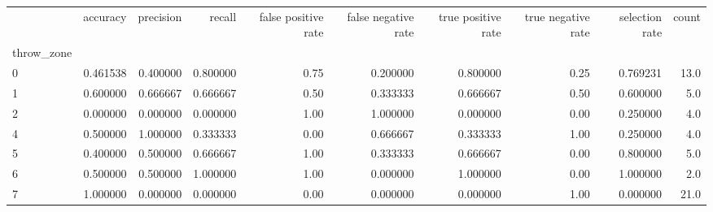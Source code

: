 \begin{tabular}{lrrrrrrrrr}
\toprule
{} &  accuracy &  precision &    recall &  false positive rate &  false negative rate &  true positive rate &  true negative rate &  selection rate &  count \\
throw\_zone &           &            &           &                      &                      &                     &                     &                 &        \\
\midrule
0          &  0.461538 &   0.400000 &  0.800000 &                 0.75 &             0.200000 &            0.800000 &                0.25 &        0.769231 &   13.0 \\
1          &  0.600000 &   0.666667 &  0.666667 &                 0.50 &             0.333333 &            0.666667 &                0.50 &        0.600000 &    5.0 \\
2          &  0.000000 &   0.000000 &  0.000000 &                 1.00 &             1.000000 &            0.000000 &                0.00 &        0.250000 &    4.0 \\
4          &  0.500000 &   1.000000 &  0.333333 &                 0.00 &             0.666667 &            0.333333 &                1.00 &        0.250000 &    4.0 \\
5          &  0.400000 &   0.500000 &  0.666667 &                 1.00 &             0.333333 &            0.666667 &                0.00 &        0.800000 &    5.0 \\
6          &  0.500000 &   0.500000 &  1.000000 &                 1.00 &             0.000000 &            1.000000 &                0.00 &        1.000000 &    2.0 \\
7          &  1.000000 &   0.000000 &  0.000000 &                 0.00 &             0.000000 &            0.000000 &                1.00 &        0.000000 &   21.0 \\
\bottomrule
\end{tabular}
